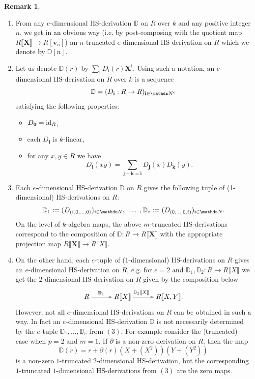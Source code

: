 \documentclass[10pt]{amsart}
\theoremstyle{definition}
\newtheorem{remark}[theorem]{Remark}
\begin{document}
\begin{remark}\label{edimrem}
\begin{enumerate}
\item From any $e$-dimensional HS-derivation $\mathbb{D}$ on $R$ over $k$ and any positive integer $n$, we get in an obvious way (i.e. by post-composing with the quotient map $R\llbracket \mathbf{X}\rrbracket\to  R[\mathbf{v}_n]$) an $n$-truncated $e$-dimensional HS-derivation on $R$ which we denote by $\mathbb{D}[n]$.

\item Let us denote $\mathbb{D}(r)$ by $\sum_{\mathbf{i}} D_{\mathbf{i}}(r)\mathbf{X}^{\mathbf{i}}$. Using such a notation, an $e$-dimensional HS-derivation on $R$ over $k$ is a sequence
$$\mathbb{D}=(D_{\mathbf{i}}:R\to R)_{\mathbf{i}\in \Nn^e}$$
satisfying the following properties:
\begin{itemize}
\item $D_{\mathbf{0}}=\operatorname{id}_R$,

\item each $D_{\mathbf{i}}$ is $k$-linear,

\item for any $x,y\in R$ we have
$$D_{\mathbf{i}}(xy)=\sum_{\mathbf{j}+\mathbf{k}=\mathbf{i}}D_{\mathbf{j}}(x)D_{\mathbf{k}}(y).$$
\end{itemize}

\item Each $e$-dimensional HS-derivation $\mathbb{D}$ on $R$ gives the following tuple of (1-dimensional) HS-derivations on $R$:
$$\mathbb{D}_1:=(D_{(i,0,\ldots,0)})_{i\in \Nn},\ \ldots \ ,\mathbb{D}_e:=(D_{(0,\ldots,0,i)})_{i\in \Nn}.$$
On the level of $k$-algebra maps, the above $m$-truncated HS-derivations correspond to the composition of $\mathbb{D}:R\to R\llbracket \mathbf{X}\rrbracket$ with the appropriate projection map $R\llbracket \mathbf{X}\rrbracket\to R\llbracket X\rrbracket$.

\item On the other hand, each $e$-tuple of (1-dimensional) HS-derivations on $R$ gives an $e$-dimensional HS-derivation on $R$, e.g. for $e=2$ and $\mathbb{D}_1,\mathbb{D}_2:R\to  R\llbracket X\rrbracket$ we get the $2$-dimensional HS-derivation on $R$ given by the composition below
    \begin{equation*}
 \xymatrixcolsep{2.5pc}\xymatrixrowsep{1.5pc}\xymatrix{R \ar[r]^{\mathbb{D}_1\ \ \ }  & R\llbracket X\rrbracket \ar[r]^{\mathbb{D}_2\llbracket X\rrbracket\ \ \ \  } &
R\llbracket X,Y\rrbracket .}
\end{equation*}
\noindent
However, not all $e$-dimensional HS-derivations on $R$ can be obtained in such a way. In fact an $e$-dimensional HS-derivation $\mathbb{D}$ is not necessarily determined by the $e$-tuple $\mathbb{D}_1,\ldots,\mathbb{D}_e$ from $(3)$. For example consider the (truncated) case when $p=2$ and $m=1$. If $\partial$ is a non-zero derivation on $R$, then the map
$$\mathbb{D}(r)=r+\partial(r)(X+(X^2))(Y+(Y^2))$$
is a non-zero $1$-truncated $2$-dimensional HS-derivation, but the corresponding $1$-truncated $1$-dimensional HS-derivations from $(3)$ are the zero maps.



\end{enumerate}
\end{remark}
\end{document}
